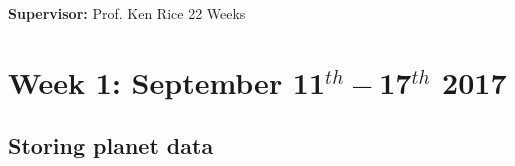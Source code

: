 \documentclass[11pt, oneside]{article}   	%
\begin{document}
\vspace*{0.35cm}

\vspace*{1cm}
{\bf Supervisor:} Prof. Ken Rice           %
\hfill
22 Weeks                                         %

\thispagestyle{empty}
\newpage
{}
\pagestyle{plain}
\tableofcontents
\newpage
{}
\pagestyle{fancy}

\section{Week 1: September 11$^{th}-$17$^{th}$ 2017}

\subsection{Storing planet data}
\label{Planet}
\end{document}
